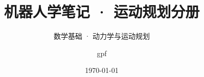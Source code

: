 
\usepackage{xr-hyper}


\title{机器人学笔记 · 运动规划分册}
\subtitle{数学基础 · 动力学与运动规划}
\author{gpf}\date{\today}


\maketitle
\frontmatter
\tableofcontents
\mainmatter


\backmatter
\nocite{*}
\printbibliography[heading=bibintoc, title={参考文献}]

